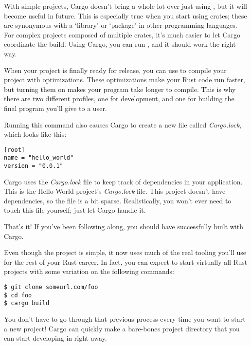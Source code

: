 \blank

With simple projects, Cargo doesn't bring a whole lot over just using , but it will become useful in future. This 
is especially true when you start using crates; these are synonymous with a ‘library’ or ‘package’ in other programming languages. 
For complex projects composed of multiple crates, it’s much easier to let Cargo coordinate the build. Using Cargo, you can run 
, and it should work the right way.


When your project is finally ready for release, you can use  to compile your project with optimizations. 
These optimizations make your Rust code run faster, but turning them on makes your program take longer to compile. This is why 
there are two different profiles, one for development, and one for building the final program you’ll give to a user.

\blank

Running this command also causes Cargo to create a new file called \emph{Cargo.lock}, which looks like this:

\begin{verbatim}
[root]
name = "hello_world"
version = "0.0.1"
\end{verbatim}

Cargo uses the \emph{Cargo.lock} file to keep track of dependencies in your application. This is the Hello World project's 
\emph{Cargo.lock} file. This project doesn't have dependencies, so the file is a bit sparse. Realistically, you won't ever 
need to touch this file yourself; just let Cargo handle it.

\blank

That’s it! If you've been following along, you should have successfully built  with Cargo.

\blank

Even though the project is simple, it now uses much of the real tooling you’ll use for the rest of your Rust career. 
In fact, you can expect to start virtually all Rust projects with some variation on the following commands:

\begin{verbatim}
$ git clone someurl.com/foo
$ cd foo
$ cargo build 
\end{verbatim}


You don’t have to go through that previous process every time you want to start a new project! Cargo can quickly make a 
bare-bones project directory that you can start developing in right away.

